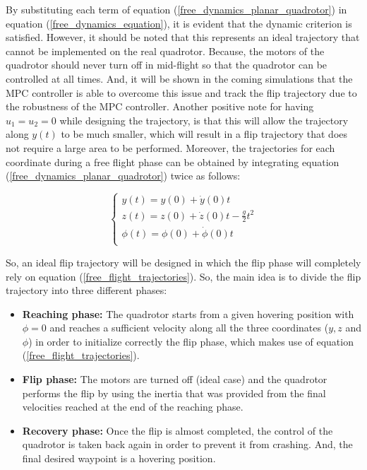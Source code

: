 \documentclass{thesisreport}
\begin{document}
By substituting each term of equation (\ref{free_dynamics_planar_quadrotor}) in equation (\ref{free_dynamics_equation}), it is evident that the dynamic criterion is satisfied. However, it should be noted that this represents an ideal trajectory that cannot be implemented on the real quadrotor. Because, the motors of the quadrotor should never turn off in mid-flight so that the quadrotor can be controlled at all times. 
And, it will be shown in the coming simulations that the MPC controller is able to overcome this issue and track the flip trajectory due to the robustness of the MPC controller. Another positive note for having $u_1=u_2=0$ while designing the trajectory, is that this will allow the trajectory along $y(t)$ to be much smaller, which will result in a flip trajectory that does not require a large area to be performed.
Moreover, the trajectories for each coordinate during a free flight phase can be obtained by integrating equation (\ref{free_dynamics_planar_quadrotor}) twice as follows:

\begin{equation}\label{free_flight_trajectories}
 \begin{cases} 
       y(t) = y(0) + \dot{y}(0)t \\
       z(t) = z(0) +\dot{z}(0)t - \frac{g}{2}t^2  \\
       \phi(t) = \phi(0) + \dot{\phi}(0)t \\
   \end{cases}
\end{equation}

So, an ideal flip trajectory will be designed in which the flip phase will completely rely on equation (\ref{free_flight_trajectories}). So, the main idea is to divide the flip trajectory into three different phases: 

\begin{itemize}
	\item [] \textbf{Reaching phase:} The quadrotor starts from a given hovering position with $\phi=0$ and reaches a sufficient velocity along all the three coordinates ($y,z$ and $\phi$) in order to initialize correctly the flip phase, which makes use of equation (\ref{free_flight_trajectories}).
	\item [] \textbf{Flip phase: } The motors are turned off (ideal case) and the quadrotor performs the flip by using the inertia that was provided from the final velocities reached at the end of the reaching phase.
	\item [] \textbf{Recovery phase: } Once the flip is almost completed, the control of the quadrotor is taken back again in order to prevent it from crashing. And, the final desired waypoint is a hovering position.  
\end{itemize}
\end{document}
